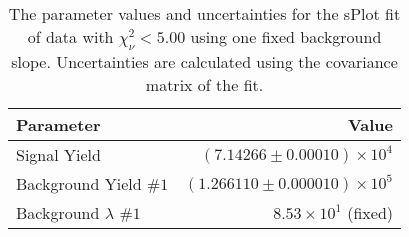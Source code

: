
\begin{table}[ht]
    \begin{center}
        \begin{tabular}{lr}\toprule
            Parameter & Value \\\midrule
            Signal Yield & $(7.14266 \pm 0.00010) \times 10^{4}$ \\
            Background Yield $\#1$ & $(1.266110 \pm 0.000010) \times 10^{5}$ \\
            Background $\lambda$ $\#1$ & $8.53 \times 10^{1}$ (fixed) \\\bottomrule
        \end{tabular}
        \caption{The parameter values and uncertainties for the sPlot fit of data with $\chi^2_\nu < 5.00$ using one fixed background slope. Uncertainties are calculated using the covariance matrix of the fit.}\label{tab:splot-fit-results-chisqdof-5.00-fixed-1}
    \end{center}
\end{table}
